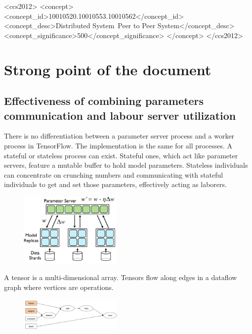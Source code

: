 \documentclass[acmlarge]{acmart}
\begin{document}
\begin{CCSXML}
  <ccs2012>
  <concept>
  <concept_id>10010520.10010553.10010562</concept_id>
  <concept_desc>Distributed System~Peer to Peer System</concept_desc>
  <concept_significance>500</concept_significance>
  </concept>
  </ccs2012>
\end{CCSXML}



\maketitle
\section{Strong point of the document}

\subsection{Effectiveness of combining parameters communication and labour server utilization}
There is no differentiation between a parameter server process and a worker process in TensorFlow. The implementation is the same for all processes. A stateful or stateless process can exist. Stateful ones, which act like parameter servers, feature a mutable buffer to hold model parameters. Stateless individuals can concentrate on crunching numbers and communicating with stateful individuals to get and set those parameters, effectively acting as laborers.
\begin{figure}[htbp]
  \centering
  \includegraphics[width=5cm]{./workers.png}
\end{figure}
A tensor is a multi-dimensional array. Tensors flow along edges in a dataflow graph where vertices are operations.
\begin{figure}[htbp]
  \centering
  \includegraphics[width=5cm]{./tensor.png}
\end{figure}
\end{document}
